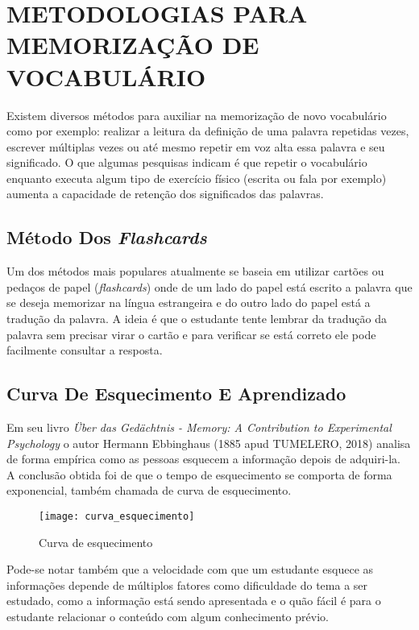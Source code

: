 \chapter{METODOLOGIAS PARA MEMORIZAÇÃO DE VOCABULÁRIO}
\label{chap:metodologias}
Existem diversos métodos para auxiliar na memorização de novo vocabulário como por exemplo: realizar a leitura da definição de uma palavra repetidas vezes, escrever múltiplas vezes ou até mesmo repetir em voz alta essa palavra e seu significado. O que algumas pesquisas indicam é que repetir o vocabulário enquanto executa algum tipo de exercício físico (escrita ou fala por exemplo) aumenta a capacidade de retenção dos significados das palavras.

\section{Método Dos \textit{Flashcards}}
Um dos métodos mais populares atualmente se baseia em utilizar cartões ou pedaços de papel (\textit{flashcards}) onde de um lado do papel está escrito a palavra que se deseja memorizar na língua estrangeira e do outro lado do papel está a tradução da palavra. A ideia é que o estudante tente lembrar da tradução da palavra sem precisar virar o cartão e para verificar se está correto ele pode facilmente consultar a resposta.

\section{Curva De Esquecimento E Aprendizado }
Em seu livro \textit{Über das Gedächtnis - Memory: A Contribution to Experimental Psychology} o autor Hermann Ebbinghaus (1885 apud TUMELERO, 2018) analisa de forma empírica como as pessoas esquecem a informação depois de adquiri-la. A conclusão obtida foi de que o tempo de esquecimento se comporta de forma exponencial, também chamada de curva de esquecimento.

\begin{figure}[H]
\caption{\label{fig:curva_esquecimento}Curva de esquecimento}
\begin{center}
\texttt{[image: curva\_esquecimento]}
\end{center}
\end{figure}

Pode-se notar também que a velocidade com que um estudante esquece as informações depende de múltiplos fatores como dificuldade do tema a ser estudado, como a informação está sendo apresentada e o quão fácil é para o estudante relacionar o conteúdo com algum conhecimento prévio.


